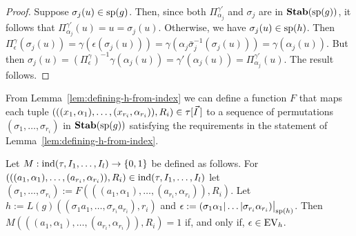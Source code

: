 \documentclass[../main/thesis.tex]{subfiles}
\begin{document}
\begin{proof}
  Suppose $\sigma_j (u) \in \text{sp}(g)$. Then, since both
  $\Pi^{\gamma'}_{\alpha_j}$ and $\sigma_j$ are in $\text{\textbf{Stab}} (\text{sp} (g))$, it follows that
  $\Pi^{\gamma'}_{\alpha_j}(u) = u = \sigma_j(u)$. Otherwise, we have $\sigma_j
  (u) \in \text{sp}(h)$. Then $\Pi^{\gamma}_{\epsilon} (\sigma_j (u)) = \gamma
  (\epsilon (\sigma_j(u))) = \gamma(\alpha_j \bar{\sigma}^{-1}_j (\sigma_j (u)))
  = \gamma(\alpha_j (u))$. But then $\sigma_j (u) =
  (\Pi^{\gamma}_{\epsilon})^{-1} \gamma (\alpha_j(u)) = \gamma' (\alpha_j(u)) =
  \Pi^{\gamma'}_{\alpha_j} (u)$. The result follows.
\end{proof}

From Lemma~\ref{lem:defining-h-from-index} we can define a function $F$ that
maps each tuple $(((x_1, \alpha_1), \ldots, (x_{r_i}, \alpha_{r_i})), R_i) \in
\tau[\vec{I}\,]$ to a sequence of permutations $(\sigma_1, \ldots,
\sigma_{r_i})$ in $\text{\textbf{Stab}} (\text{sp} (g))$ satisfying the requirements in the statement of
Lemma~\ref{lem:defining-h-from-index}.

Let $M : \text{\upshape ind} (\tau, I_1, \ldots , I_l) \rightarrow \{0,1\}$ be defined as follows. For
$(((a_1, \alpha_1), \ldots, (a_{r_i}, \alpha_{r_i})), R_i) \in \text{\upshape ind} (\tau, I_1,
\ldots , I_l)$ let $(\sigma_1, \ldots, \sigma_{r_i}) := F(((a_1, \alpha_1),
\ldots, (a_{r_i}, \alpha_{r_i})), R_i)$. Let $h := L(g)((\sigma_1 a_1, \ldots,
\sigma_{r_i} a_{r_i}), r_i)$ and $\epsilon := \restr{(\sigma_1 \alpha_1 \vert
  \ldots \vert \sigma_{r_i} \alpha_{r_i})}{\consp(h)}$. Then $M(((a_1,
\alpha_1), \ldots, (a_{r_i}, \alpha_{r_i})), R_i) = 1$ if, and only if,
$\epsilon \in \text{EV}_h$.
\end{document}
